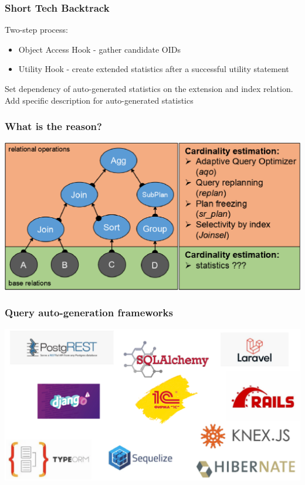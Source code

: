 \documentclass[xcolor=table]{beamer}
\begin{document}
\begin{frame}[fragile]\frametitle{Short Tech Backtrack}
Two-step process:
\begin{itemize}
  \item Object Access Hook - gather candidate OIDs 
  \item Utility Hook - create extended statistics after a successful utility statement
\end{itemize}
Set dependency of auto-generated statistics on the extension and index relation.\\
Add specific description for auto-generated statistics
\end{frame}

\begin{frame}[fragile]\frametitle{What is the reason?}
	\includegraphics[scale=0.52]{pics/querytree}
\end{frame}

\begin{frame}[fragile]\frametitle{Query auto-generation frameworks}
\begin{center}
	\includegraphics[scale=0.4]{pics/orms}
\end{center}
\end{frame}
\end{document}
